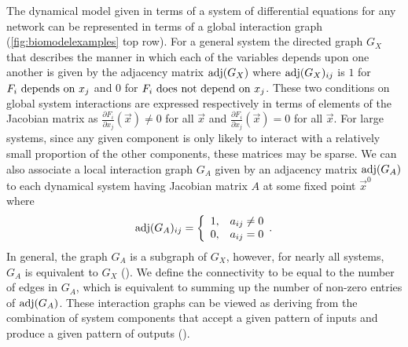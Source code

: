 The dynamical model given in terms of a system of differential equations for any network can be represented in terms of a global interaction graph (\ref{fig:biomodelexamples} top row).
For a general system the directed graph $G_X$ that describes the manner in which each of the variables depends upon one another is given by the adjacency matrix $\mathrm{adj}(G_X)$ where $\mathrm{adj}(G_X)_{ij}$ is $1$ for $F_i \hbox{ depends on } x_j$ and $0$ for $F_i \hbox{ does not depend on } x_j$. These two conditions on global system interactions are expressed respectively in terms of elements of the Jacobian matrix as $\frac{\partial F_i}{\partial x_j}(\vec{x}) \neq 0$ for all $\vec{x}$ and $\frac{\partial F_i}{\partial x_j}(\vec{x}) = 0$ for all $\vec{x}$.
For large systems, since any given component is only likely to interact with a relatively small proportion of the other components, these matrices may be sparse.
We can also associate a local interaction graph $G_A$ given by an adjacency matrix $\mathrm{adj}(G_A)$ to each dynamical system having Jacobian matrix $A$ at some fixed point $\vec{x}^0$ where
 \begin{equation}\label{eq:lininterdepadj}
   \mathrm{adj}(G_A)_{ij} = \left\{
     \begin{array}{lr}
       1, & a_{ij} \neq 0\\
       0, & a_{ij} = 0
     \end{array}.
   \right.
\end{equation}
In general, the graph $G_A$ is a subgraph of $G_X$, however, for nearly all systems, $G_A$ is equivalent to $G_X$ (). We define the connectivity to be equal to the number of edges in $G_A$, which is equivalent to summing up the number of non-zero entries of $\mathrm{adj}(G_A)$.
These interaction graphs can be viewed as deriving from the combination of system components that accept a given pattern of inputs and produce a given pattern of outputs ().

